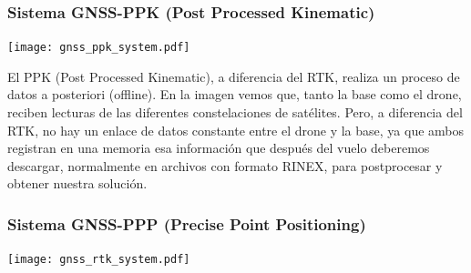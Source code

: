 \begin{frame}
    \frametitle{Sistema GNSS-PPK (Post Processed Kinematic)}
    \begin{center}
        \texttt{[image: gnss\_ppk\_system.pdf]}
    \end{center}

    El PPK (Post Processed Kinematic), a diferencia del RTK, realiza un proceso de datos a posteriori (offline).
    En la imagen vemos que, tanto la base como el drone, reciben lecturas de las diferentes constelaciones de satélites. Pero, a diferencia del RTK, no hay un enlace de datos constante entre el drone y la base, ya que ambos registran en una memoria esa información que después del vuelo deberemos descargar, normalmente en archivos con formato RINEX, para postprocesar y obtener nuestra solución.
    
\end{frame}

\begin{frame}
    \frametitle{Sistema GNSS-PPP (Precise Point Positioning)}
    \begin{center}
        \texttt{[image: gnss\_rtk\_system.pdf]}
    \end{center}

\end{frame}